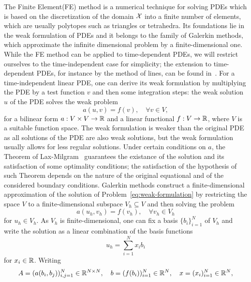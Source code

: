 The Finite Element(FE) method is a numerical technique for solving PDEs which is based on the discretization of the domain $\mathcal X$ into a finite number of elements, which are usually polytopes such as triangles or tetrahedra.
Its foundations lie in the weak formulation of PDEs and it belongs to the family of Galerkin methods, which approximate the infinite dimensional problem by a finite-dimensional one.
While the FE method can be applied to time-dependent PDEs, we will restrict ourselves to the time-independent case for simplicity; the extension to time-dependent PDEs, for instance by the method of lines, can be found in~\cite[Chapter 9]{DeuflhardWeiser2012}. \newline
For a time-independent linear PDE, one can derive its weak formulation by multiplying the PDE by a test function $v$ and then some integration steps: the weak solution $u$ of the PDE solves the weak problem 
\begin{equation}\label{eq:weak-formulation}
    a(u,v) = f(v), \quad \forall v \in V,
\end{equation}
for a bilinear form $a: V \times V \rightarrow \mathbb{R}$ and a linear functional $f: V \rightarrow \mathbb{R}$, where $V$ is a suitable function space.
The weak formulation is weaker than the original PDE as all solutions of the PDE are also weak solutions, but the weak formulation usually allows for less regular solutions.
Under certain conditions on $a$, the Theorem of Lax-Milgram~\cite{LaxMilgram1955} guarantees the existance of the solution and its satisfaction of some optimality conditions; the satisfaction of the hypothesis of such Theorem depends on the nature of the original equational and of the considered boundary conditions. \newline
Galerkin methods construct a finite-dimensional approximation of the solution of Problem~\eqref{eq:weak-formulation} by restricting the space $V$ to a finite-dimensional subspace $V_h \subseteq V$ and then solving the problem
\begin{equation*}
    a(u_h,v_h) = f(v_h), \quad \forall v_h \in V_h
\end{equation*} 
for $u_h \in V_h$.
As $V_h$ is finite-dimensional, one can fix a basis $\{ b_i\}_{i=1}^N$ of $V_h$ and write the solution as a linear combination of the basis functions
\[
    u_h = \sum_{i=1}^N x_i b_i
\]
for $x_i \in \mathbb{R}$.
Writing 
\begin{equation*}
    A = (a(b_i,b_j))_{i,j=1}^N \in \mathbb{R}^{N \times N}, \quad b = (f(b_i))_{i=1}^N \in \mathbb{R}^N, \quad x = (x_i)_{i=1}^N \in \mathbb{R}^N,
\end{equation*} 
